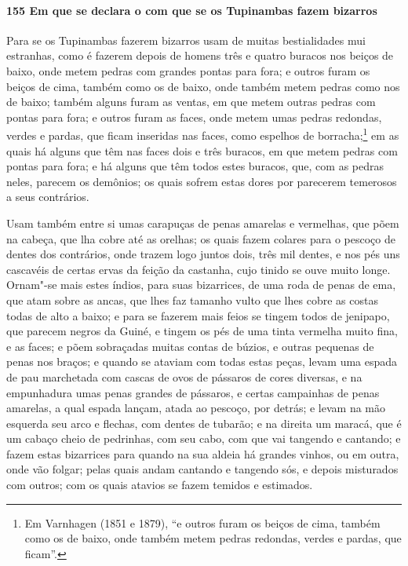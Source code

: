 \begin{linenumbers}
\paragraph{155 Em que se declara o com que se os Tupinambas fazem bizarros}\quad
Para se os Tupinambas fazerem bizarros usam de muitas bestialidades mui estranhas, como é
fazerem depois de homens três e quatro buracos nos beiços de baixo, onde metem pedras com
grandes pontas para fora; e outros furam os beiços de cima, também como os de baixo, onde
também metem pedras como nos de baixo; também alguns furam as ventas, em que metem outras
pedras com pontas para fora; e outros furam as faces, onde metem umas pedras redondas,
verdes e pardas, que ficam inseridas nas faces, como espelhos de borracha;\footnote{ Em
Varnhagen (1851 e 1879), ``e outros furam os beiços de cima, também como os de baixo, onde
também metem pedras redondas, verdes e pardas, que ficam''.} em as quais há alguns que têm
nas faces dois e três buracos, em que metem pedras com pontas para fora; e há alguns que
têm todos estes buracos, que, com as pedras neles, parecem os demônios; os quais sofrem
estas dores por parecerem temerosos a seus contrários.

Usam também entre si umas carapuças de penas amarelas e vermelhas, que põem na cabeça, que
lha cobre até as orelhas; os quais fazem colares para o pescoço de dentes dos contrários,
onde trazem logo juntos dois, três mil dentes, e nos pés uns cascavéis de certas ervas da
feição da castanha, cujo tinido se ouve muito longe. Ornam"-se mais estes índios, para suas
bizarrices, de uma roda de penas de ema, que atam sobre as ancas, que lhes faz tamanho
vulto que lhes cobre as costas todas de alto a baixo; e para se fazerem mais feios se
tingem todos de jenipapo, que parecem negros da Guiné, e tingem os pés de uma tinta
vermelha muito fina, e as faces; e põem sobraçadas muitas contas de búzios, e outras
pequenas de penas nos braços; e quando se ataviam com todas estas peças, levam uma espada
de pau marchetada com cascas de ovos de pássaros de cores diversas, e na empunhadura umas
penas grandes de pássaros, e certas campainhas de penas amarelas, a qual espada lançam,
atada ao pescoço, por detrás; e levam na mão esquerda seu arco e flechas, com dentes de
tubarão; e na direita um maracá, que é um cabaço cheio de pedrinhas, com seu cabo, com que
vai tangendo e cantando; e fazem estas bizarrices para quando na sua aldeia há grandes
vinhos, ou em outra, onde vão folgar; pelas quais andam cantando e tangendo sós, e depois
misturados com outros; com os quais atavios se fazem temidos e estimados.


\end{linenumbers}

